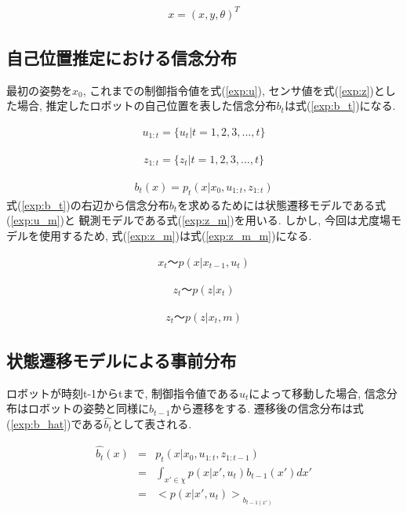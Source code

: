 \begin{eqnarray}
  \label{exp:x}
  x = (x, y ,\theta)^T
\end{eqnarray}

\subsection{自己位置推定における信念分布}

最初の姿勢を$x_0$, これまでの制御指令値を式(\ref{exp:u}), センサ値を式(\ref{exp:z})とした場合, 
推定したロボットの自己位置を表した信念分布$b_t$は式(\ref{exp:b_t})になる. 

\begin{eqnarray}
  \label{exp:u}
  u_{1:t} = \{u_t|t=1,2,3,...,t\} 
\end{eqnarray}

\begin{eqnarray}
  \label{exp:z}
  z_{1:t} = \{z_t|t=1,2,3,...,t\} 
\end{eqnarray}

\begin{eqnarray}
  \label{exp:b_t}
  b_t(x) = p_t(x|x_0, u_{1:t}, z_{1:t}) 
\end{eqnarray}
式(\ref{exp:b_t})の右辺から信念分布$b_t$を求めるためには状態遷移モデルである式(\ref{exp:u_m})と
観測モデルである式(\ref{exp:z_m})を用いる. 
しかし, 今回は尤度場モデルを使用するため, 式(\ref{exp:z_m})は式(\ref{exp:z_m_m})になる. 

\begin{eqnarray}
  \label{exp:u_m}
  x_t 〜 p(x|x_{t-1}, u_t)
\end{eqnarray}

\begin{eqnarray}
  \label{exp:z_m}
  z_t 〜 p(z|x_t)
\end{eqnarray}

\begin{eqnarray}
  \label{exp:z_m_m}
  z_t 〜 p(z|x_t, m)
\end{eqnarray}

\subsection{状態遷移モデルによる事前分布}

ロボットが時刻t-1からtまで, 制御指令値である$u_t$によって移動した場合, 
信念分布はロボットの姿勢と同様に$b_{t-1}$から遷移をする. 
遷移後の信念分布は式(\ref{exp:b_hat})である$\hat{b_t}$として表される. 

\begin{eqnarray}
  \label{exp:b_hat}
  \hat{b_t}(x) &=& p_t(x|x_0, u_{1:t}, z_{1:t-1}) \nonumber \\
  &=& \int_{x'\in\chi} p(x|x', u_t)b_{t-1}(x')dx' \nonumber \\
  &=& {<p(x|x', u_t)>}_{b_{t-1(x')}}
\end{eqnarray}

